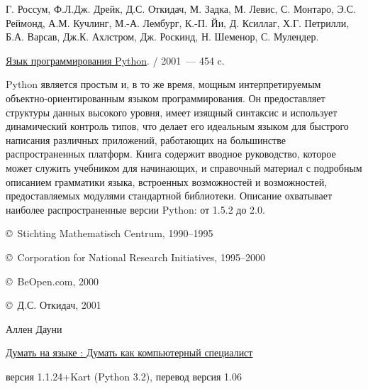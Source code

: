 \begin{thebibliography}{99}


Г. Россум, Ф.Л.Дж. Дрейк, Д.С. Откидач, М. Задка, М. Левис, С. Монтаро, Э.С.
Реймонд, А.М. Кучлинг, М.-А. Лембург, К.-П. Йи, Д. Ксиллаг, Х.Г. Петрилли, Б.А.
Варсав, Дж.К. Ахлстром, Дж. Роскинд, Н. Шеменор, С. Мулендер.

\href{http://rus-linux.net/MyLDP/BOOKS/python.pdf}{Язык программирования Python}. 
/ 2001\ --- 454 c.

Python является простым и, в то же время, мощным интерпретируемым
объектно-ориентированным языком программирования. Он предоставляет структуры
данных высокого уровня, имеет изящный синтаксис и использует динамический
контроль типов, что делает его идеальным языком для быстрого написания различных
приложений, работающих на большинстве распространенных платформ. Книга содержит
вводное руководство, которое может служить учебником для начинающих, и
справочный материал с подробным описанием грамматики языка, встроенных
возможностей и возможностей, предоставляемых модулями стандартной библиотеки.
Описание охватывает наиболее распространенные версии Python: от 1.5.2 до 2.0.

\copyright\ Stichting Mathematisch Centrum, 1990–1995

\copyright\ Corporation for National Research Initiatives, 1995–2000

\copyright\ BeOpen.com, 2000

\copyright\ Д.С. Откидач, 2001



Аллен Дауни

\href{https://drive.google.com/file/d/0B0u4WeMjO894Q2hWV1QwOFFQOVk/view?usp=sharing}{Думать
на языке \py: Думать как компьютерный специалист} 

версия 1.1.24+Kart (Python 3.2), перевод версия 1.06 

\end{thebibliography}